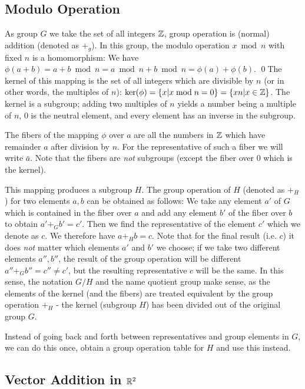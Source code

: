 
\subsection{Modulo Operation}

As group $G$ we take the set of all integers $\mathbb{Z}$, group operation is (normal) addition (denoted as $+_g$).  In this group, the modulo operation $x \bmod n$ with fixed $n$ is a homomorphism: We have $\phi(a+b) = a+b \bmod n = a \bmod n + b \bmod n = \phi(a) + \phi(b)$. \qed The kernel of this mapping is the set of all integers which are divisible by $n$ (or in other words, the multiples of $n$): $\text{ker}(\phi) = \{x | x \bmod n = 0\} = \{ xn | x \in \mathbb{Z}\}$. The kernel is a subgroup; adding two multiples of $n$ yields a number being a multiple of $n$, $0$ is the neutral element, and every element has an inverse in the subgroup.

The fibers of the mapping $\phi$ over $a$ are all the numbers in $\mathbb{Z}$ which have remainder $a$ after division by $n$. For the representative of such a fiber we will write $\bar{a}$. Note that the fibers are \emph{not} subgroups (except the fiber over $0$ which is the kernel).

This mapping produces a subgroup $H$. The group operation of $H$ (denoted as $+_H$) for two elements $a, b$ can be obtained as follows: We take any element $a'$ of $G$ which is contained in the fiber over $a$ and add any element $b'$ of the fiber over $b$ to obtain $a' +_G b' = c'$. Then we find the representative of the element $c'$ which we denote as $c$. We therefore have $a +_H b = c$.
Note that for the final result (i.e. $c$) it does \emph{not} matter which elements $a'$ and $b'$ we choose; if we take two different elements $a'', b''$, the result of the group operation will be different $a'' +_G b'' = c'' \neq c'$, but the resulting representative $c$ will be the same. In this sense, the notation $G/H$ and the name quotient group make sense, as the elements of the kernel (and the fibers) are treated equivalent by the group operation $+_H$ - the kernel (subgroup $H$) has been divided out of the original group $G$.

Instead of going back and forth between representatives and group elements in $G$, we can do this once, obtain a group operation table for $H$ and use this instead.

\subsection{Vector Addition in $\mathbb{R}^2$}

